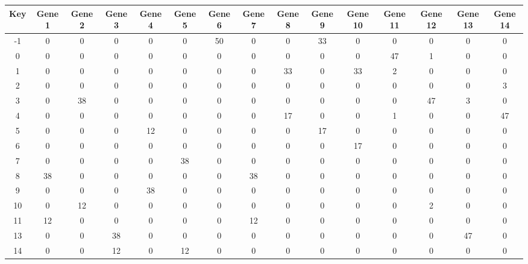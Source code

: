 \begin{tabular}{|c|c|c|c|c|c|c|c|c|c|c|c|c|c|c|}
\hline
Key & Gene 1 & Gene 2 & Gene 3 & Gene 4 & Gene 5 & Gene 6 & Gene 7 & Gene 8 & Gene 9 & Gene 10 & Gene 11 & Gene 12 & Gene 13 & Gene 14 \\
\hline
-1 & 0 & 0 & 0 & 0 & 0 & 50 & 0 & 0 & 33 & 0 & 0 & 0 & 0 & 0 \\
0 & 0 & 0 & 0 & 0 & 0 & 0 & 0 & 0 & 0 & 0 & 47 & 1 & 0 & 0 \\
1 & 0 & 0 & 0 & 0 & 0 & 0 & 0 & 33 & 0 & 33 & 2 & 0 & 0 & 0 \\
2 & 0 & 0 & 0 & 0 & 0 & 0 & 0 & 0 & 0 & 0 & 0 & 0 & 0 & 3 \\
3 & 0 & 38 & 0 & 0 & 0 & 0 & 0 & 0 & 0 & 0 & 0 & 47 & 3 & 0 \\
4 & 0 & 0 & 0 & 0 & 0 & 0 & 0 & 17 & 0 & 0 & 1 & 0 & 0 & 47 \\
5 & 0 & 0 & 0 & 12 & 0 & 0 & 0 & 0 & 17 & 0 & 0 & 0 & 0 & 0 \\
6 & 0 & 0 & 0 & 0 & 0 & 0 & 0 & 0 & 0 & 17 & 0 & 0 & 0 & 0 \\
7 & 0 & 0 & 0 & 0 & 38 & 0 & 0 & 0 & 0 & 0 & 0 & 0 & 0 & 0 \\
8 & 38 & 0 & 0 & 0 & 0 & 0 & 38 & 0 & 0 & 0 & 0 & 0 & 0 & 0 \\
9 & 0 & 0 & 0 & 38 & 0 & 0 & 0 & 0 & 0 & 0 & 0 & 0 & 0 & 0 \\
10 & 0 & 12 & 0 & 0 & 0 & 0 & 0 & 0 & 0 & 0 & 0 & 2 & 0 & 0 \\
11 & 12 & 0 & 0 & 0 & 0 & 0 & 12 & 0 & 0 & 0 & 0 & 0 & 0 & 0 \\
13 & 0 & 0 & 38 & 0 & 0 & 0 & 0 & 0 & 0 & 0 & 0 & 0 & 47 & 0 \\
14 & 0 & 0 & 12 & 0 & 12 & 0 & 0 & 0 & 0 & 0 & 0 & 0 & 0 & 0 \\
\hline
\end{tabular}